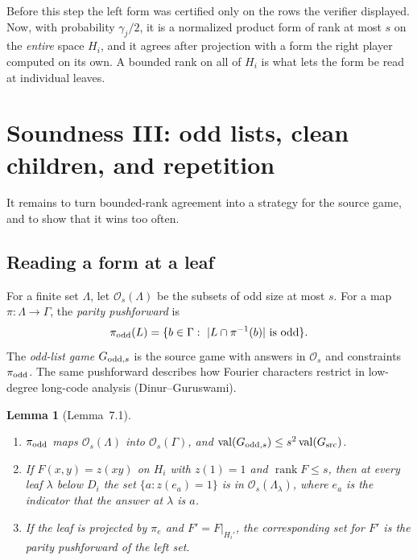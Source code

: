 \documentclass[11pt]{article}
\newtheorem{lemma}[theorem]{Lemma}
\theoremstyle{definition}
\theoremstyle{remark}
\DeclareMathOperator{\val}{val}
\DeclareMathOperator{\rank}{rank}
\newcommand{\cO}{\mathcal O}
\begin{document}
\begin{idea}
Before this step the left form was certified only on the rows the verifier
displayed. Now, with probability $\gamma_j/2$, it is a normalized product form
of rank at most $s$ on the \emph{entire} space $H_i$, and it agrees after
projection with a form the right player computed on its own. A bounded rank
on all of $H_i$ is what lets the form be read at individual leaves.
\end{idea}

\section{Soundness III: odd lists, clean children, and repetition}\label{sec:clean}

It remains to turn bounded-rank agreement into a strategy for the source
game, and to show that it wins too often.

\subsection{Reading a form at a leaf}

For a finite set $\Lambda$, let $\cO_s(\Lambda)$ be the subsets of odd size at
most $s$. For a map $\pi:\Lambda\to\Gamma$, the \emph{parity pushforward} is
\[
 \pi_{\rm odd}(L)=\{b\in\Gamma:\ |L\cap\pi^{-1}(b)|\text{ is odd}\}.
\]
The \emph{odd-list game} $G_{{\rm odd},s}$ is the source game with answers
in $\cO_s$ and constraints $\pi_{\rm odd}$. The same pushforward describes how Fourier characters
restrict in low-degree long-code analysis (Dinur--Guruswami).

\begin{lemma}[Lemma~7.1]\label{lem:odd}
\begin{enumerate}
\item $\pi_{\rm odd}$ maps $\cO_s(\Lambda)$ into $\cO_s(\Gamma)$, and
$\val(G_{{\rm odd},s})\le s^2\val(G_{\rm src})$.
\item If $F(x,y)=z(xy)$ on $H_i$ with $z(1)=1$ and $\rank F\le s$, then at
every leaf $\lambda$ below $D_i$ the set $\{a: z(e_a)=1\}$ is in
$\cO_s(\Lambda_\lambda)$, where $e_a$ is the indicator that the answer at
$\lambda$ is $a$.
\item If the leaf is projected by $\pi_e$ and $F'=F|_{H_i'}$, the
corresponding set for $F'$ is the parity pushforward of the left set.
\end{enumerate}
\end{lemma}
\end{document}
